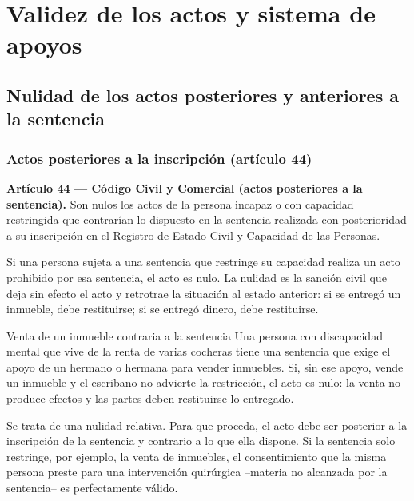 \documentclass[12pt,oneside]{book}
\begin{document}
\chapter{Validez de los actos y sistema de apoyos}
\label{ch:bloque4}

\section{Nulidad de los actos posteriores y anteriores a la sentencia}

\subsection{Actos posteriores a la inscripción (artículo 44)}

\begin{important}
\textbf{Artículo 44 --- Código Civil y Comercial (actos posteriores a la sentencia).} Son nulos los actos de la persona incapaz o con capacidad restringida que contrarían lo dispuesto en la sentencia realizada con posterioridad a su inscripción en el Registro de Estado Civil y Capacidad de las Personas.
\end{important}

Si una persona sujeta a una sentencia que restringe su capacidad realiza un acto prohibido por esa sentencia, el acto es nulo. La nulidad es la sanción civil que deja sin efecto el acto y retrotrae la situación al estado anterior: si se entregó un inmueble, debe restituirse; si se entregó dinero, debe restituirse.

\begin{example}{Venta de un inmueble contraria a la sentencia}
Una persona con discapacidad mental que vive de la renta de varias cocheras tiene una sentencia que exige el apoyo de un hermano o hermana para vender inmuebles. Si, sin ese apoyo, vende un inmueble y el escribano no advierte la restricción, el acto es nulo: la venta no produce efectos y las partes deben restituirse lo entregado.
\end{example}

Se trata de una nulidad relativa. Para que proceda, el acto debe ser posterior a la inscripción de la sentencia y contrario a lo que ella dispone. Si la sentencia solo restringe, por ejemplo, la venta de inmuebles, el consentimiento que la misma persona preste para una intervención quirúrgica --materia no alcanzada por la sentencia-- es perfectamente válido.
\end{document}
